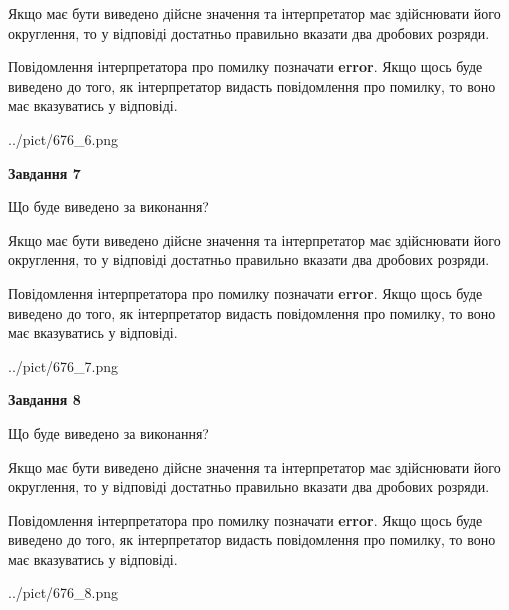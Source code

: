 \documentclass[12pt, ukrainian]{article}
\begin{document}
{\begin {Large}
Якщо має бути виведено дійсне значення та інтерпретатор має здійснювати його округлення, 
то у відповіді достатньо правильно вказати два дробових розряди.

Повідомлення інтерпретатора про помилку позначати \textbf{error}.
Якщо щось буде виведено до того, як інтерпретатор видасть повідомлення про помилку, 
то воно має вказуватись у відповіді. \par

\begin{center}
	{../pict/676_6.png}
\end{center}
\newpage

{\begin {center}\textbf{Завдання 7}\end {center}}\par
Що буде виведено за виконання? \par

Якщо має бути виведено дійсне значення та інтерпретатор має здійснювати його округлення, 
то у відповіді достатньо правильно вказати два дробових розряди.

Повідомлення інтерпретатора про помилку позначати \textbf{error}.
Якщо щось буде виведено до того, як інтерпретатор видасть повідомлення про помилку, 
то воно має вказуватись у відповіді. \par

\begin{center}
	{../pict/676_7.png}
\end{center}
\newpage

{\begin {center}\textbf{Завдання 8}\end {center}}\par
Що буде виведено за виконання? \par

Якщо має бути виведено дійсне значення та інтерпретатор має здійснювати його округлення, 
то у відповіді достатньо правильно вказати два дробових розряди.

Повідомлення інтерпретатора про помилку позначати \textbf{error}.
Якщо щось буде виведено до того, як інтерпретатор видасть повідомлення про помилку, 
то воно має вказуватись у відповіді. \par

\begin{center}
	{../pict/676_8.png}
\end{center}
\newpage


\end{Large}}
\end{document}
